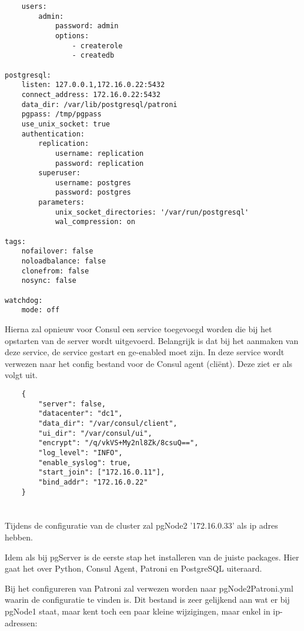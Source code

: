 \begin{lstlisting}
    users:
        admin:
            password: admin
            options:
                - createrole
                - createdb

postgresql:
    listen: 127.0.0.1,172.16.0.22:5432
    connect_address: 172.16.0.22:5432
    data_dir: /var/lib/postgresql/patroni
    pgpass: /tmp/pgpass
    use_unix_socket: true
    authentication:
        replication:
            username: replication
            password: replication
        superuser:
            username: postgres
            password: postgres
        parameters:
            unix_socket_directories: '/var/run/postgresql'
            wal_compression: on

tags:
    nofailover: false
    noloadbalance: false
    clonefrom: false
    nosync: false

watchdog:
    mode: off
\end{lstlisting}

Hierna zal opnieuw voor Consul een service toegevoegd worden die bij het opstarten van de server wordt uitgevoerd. Belangrijk is dat bij het aanmaken van deze service, de service gestart en ge-enabled moet zijn. In deze service wordt verwezen naar het config bestand voor de Consul agent (cliënt). Deze ziet er als volgt uit.

\begin{lstlisting}
    {
        "server": false,
        "datacenter": "dc1",
        "data_dir": "/var/consul/client",
        "ui_dir": "/var/consul/ui",
        "encrypt": "/q/vkVS+My2nl8Zk/8csuQ==", 
        "log_level": "INFO",
        "enable_syslog": true,
        "start_join": ["172.16.0.11"],
        "bind_addr": "172.16.0.22"
    }  
\end{lstlisting}


\section{}
\label{sec:pgNode2}
Tijdens de configuratie van de cluster zal pgNode2 '172.16.0.33' als ip adres hebben.

Idem als bij pgServer is de eerste stap het installeren van de juiste packages. Hier gaat het over Python, Consul Agent, Patroni en PostgreSQL uiteraard.

Bij het configureren van Patroni zal verwezen worden naar pgNode2Patroni.yml waarin de configuratie te vinden is. Dit bestand is zeer gelijkend aan wat er bij pgNode1 staat, maar kent toch een paar kleine wijzigingen, maar enkel in ip-adressen:

